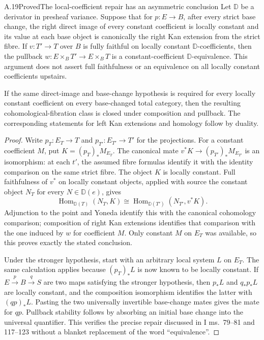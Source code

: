 \begin{claim}{A.19}{Proved}{The local-coefficient repair has an asymmetric conclusion}
Let $\mathbb D$ be a derivator in presheaf variance. Suppose that for $p:E\to B$, after every strict base change, the right direct image of every constant coefficient is locally constant and its value at each base object is canonically the right Kan extension from the strict fibre. If $v:T'\to T$ over $B$ is fully faithful on locally constant $\mathbb D$-coefficients, then the pullback $w:E\times_BT'\to E\times_BT$ is a constant-coefficient $\mathbb D$-equivalence. This argument does not assert full faithfulness or an equivalence on all locally constant coefficients upstairs.

If the same direct-image and base-change hypothesis is required for every locally constant coefficient on every base-changed total category, then the resulting cohomological-fibration class is closed under composition and pullback. The corresponding statements for left Kan extensions and homology follow by duality.
\end{claim}
\begin{proof}
Write $p_T:E_T\to T$ and $p_{T'}:E_{T'}\to T'$ for the projections. For a constant coefficient $M$, put $K=(p_T)_*M_{E_T}$. The canonical mate $v^*K\to(p_{T'})_*M_{E_{T'}}$ is an isomorphism: at each $t'$, the assumed fibre formulas identify it with the identity comparison on the same strict fibre. The object $K$ is locally constant. Full faithfulness of $v^*$ on locally constant objects, applied with source the constant object $N_T$ for every $N\in\mathbb D(e)$, gives
\[
\operatorname{Hom}_{\mathbb D(T)}(N_T,K)
 \cong\operatorname{Hom}_{\mathbb D(T')}(N_{T'},v^*K).
\]
Adjunction to the point and Yoneda identify this with the canonical cohomology comparison; composition of right Kan extensions identifies that comparison with the one induced by $w$ for coefficient $M$. Only constant $M$ on $E_T$ was available, so this proves exactly the stated conclusion.

Under the stronger hypothesis, start with an arbitrary local system $L$ on $E_T$. The same calculation applies because $(p_T)_*L$ is now known to be locally constant. If $E\xrightarrow p B\xrightarrow q S$ are two maps satisfying the stronger hypothesis, then $p_*L$ and $q_*p_*L$ are locally constant, and the composition isomorphism identifies the latter with $(qp)_*L$. Pasting the two universally invertible base-change mates gives the mate for $qp$. Pullback stability follows by absorbing an initial base change into the universal quantifier. This verifies the precise repair discussed in I ms.~79--81 and 117--123 without a blanket replacement of the word ``equivalence''.
\end{proof}

